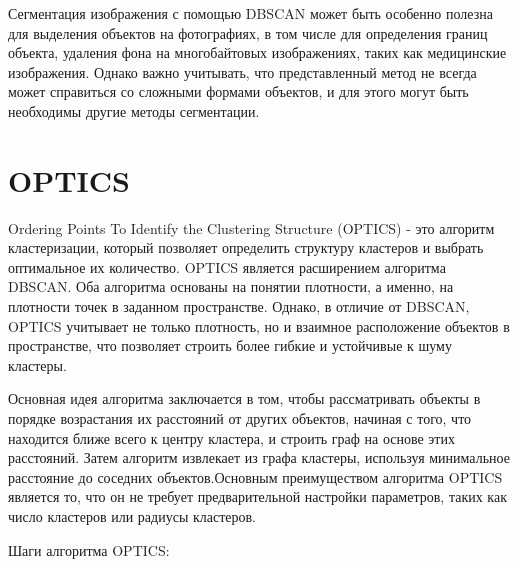 \documentclass{article}
\begin{document}
Сегментация изображения с помощью DBSCAN может быть особенно полезна для выделения объектов на фотографиях, в том числе для определения границ объекта, удаления фона на многобайтовых изображениях, таких как медицинские изображения. Однако важно учитывать, что представленный метод не всегда может справиться со сложными формами объектов, и для этого могут быть необходимы другие методы сегментации.

\section{OPTICS}

Ordering Points To Identify the Clustering Structure (OPTICS) - это алгоритм кластеризации, который позволяет определить структуру кластеров и выбрать оптимальное их количество. OPTICS является расширением алгоритма DBSCAN. Оба алгоритма основаны на понятии плотности, а именно, на плотности точек в заданном пространстве. Однако, в отличие от DBSCAN, OPTICS учитывает не только плотность, но и взаимное расположение объектов в пространстве, что позволяет строить более гибкие и устойчивые к шуму кластеры.

Основная идея алгоритма заключается в том, чтобы рассматривать объекты в порядке возрастания их расстояний от других объектов, начиная с того, что находится ближе всего к центру кластера, и строить граф на основе этих расстояний. Затем алгоритм извлекает из графа кластеры, используя минимальное расстояние до соседних объектов.Основным преимуществом алгоритма OPTICS является то, что он не требует предварительной настройки параметров, таких как число кластеров или радиусы кластеров.

Шаги алгоритма OPTICS:


\end{document}
